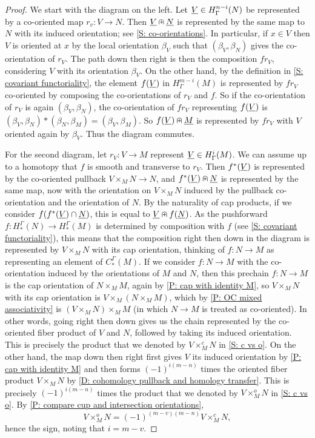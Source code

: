 \begin{proof}
	We start with the diagram on the left.
	Let $\underline{V} \in H^{n-i}_\Gamma(N)$ be represented by a co-oriented map $r_v \colon V \to N$.
	Then $\underline{V}\nplus\underline{N}$ is represented by the same map to $N$ with its induced orientation; see \cref{S: co-orientations}.
	In particular, if $x \in V$ then $V$ is oriented at $x$ by the local orientation $\beta_V$ such that $(\beta_V,\beta_N)$ gives the co-orientation of $r_V$.
	The path down then right is then the composition $fr_V$, considering $V$ with its orientation $\beta_V$.
	On the other hand, by the definition in \cref{S: covariant functoriality}, the element $f(\underline{V})$ in $H^{m-i}_\Gamma(M)$ is represented by $fr_V$ co-oriented by composing the co-orientations of $r_V$ and $f$.
	So if the co-orientation of $r_V$ is again $(\beta_V,\beta_N)$, the co-orientation of $fr_V$ representing $f(\underline{V})$ is $(\beta_V,\beta_N)*(\beta_N,\beta_M) = (\beta_V,\beta_M)$.
	So $f(\underline{V})\nplus \underline{M}$ is represented by $fr_V$ with $V$ oriented again by $\beta_V$.
	Thus the diagram commutes.

	For the second diagram, let $r_V \colon V \to M$ represent $\underline{V} \in H^{i}_\Gamma(M)$.
	We can assume up to a homotopy that $f$ is smooth and transverse to $r_V$.
	Then $f^*(\underline{V})$ is represented by the co-oriented pullback $V \times_M N \to N$, and $f^*(\underline{V})\nplus\underline{N}$ is represented by the same map, now with the orientation on $V \times_M N$ induced by the pullback co-orientation and the orientation of $N$.
	By the naturality of cap products, if we consider $f(f^*(\underline{V}) \cap \underline{N})$, this is equal to $\underline{V} \nplus f(\underline{N})$.
	As the pushforward $f \colon H_*^\Gamma(N) \to H_*^\Gamma(M)$ is determined by composition with $f$ (see \cref{S: covariant functoriality}), this means that the composition right then down in the diagram is represented by $V \times_M N$ with its cap orientation, thinking of $f \colon N \to M$ as representing an element of $C_*^\Gamma(M)$.
	If we consider $f \colon N \to M$ with the co-orientation induced by the orientations of $M$ and $N$, then this prechain $f \colon N \to M$ is the cap orientation of $N \times_M M$, again by \cref{P: cap with identity M}, so $V \times_M N$ with its cap orientation is $V \times_M (N \times_M M)$, which by \cref{P: OC mixed associativity} is $(V \times_M N) \times_M M$ (in which $N \to M$ is treated as co-oriented).
	In other words, going right then down gives us the chain represented by the co-oriented fiber product of $V$ and $N$, followed by taking its induced orientation.
	This is precisely the product that we denoted by $V \times^c_M N$ in \cref{S: c vs o}.
	On the other hand, the map down then right first gives $V$ its induced orientation by \cref{P: cap with identity M} and then forms $(-1)^{i(m-n)}$ times the oriented fiber product $V \times_M N$ by \cref{D: cohomology pullback and homology transfer}.
	This is precisely $(-1)^{i(m-n)}$ times the product that we denoted by $V \times^o_M N$ in \cref{S: c vs o}.
	By \cref{P: compare cup and intersection orientations},
	$$V \times_M^o N = (-1)^{(m-v)(m-n)} V \times_M^c N,$$
	hence the sign, noting that $i = m-v$.
\end{proof}
